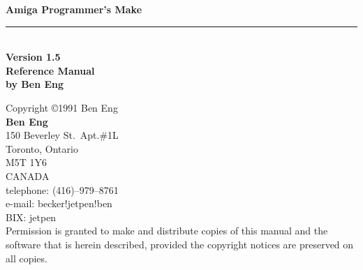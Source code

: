 


\begin{titlepage}
	\vspace*{1.0in}
	\begin{flushright}
		{\huge\bf Amiga Programmer's Make} \\[.25cm]
		{\rule[.1in]{4.5in}{.02in}}\\[.25cm]
		{\large\bf Version 1.5} \\[2.0cm]
		{\large\bf Reference Manual} \\[4.0cm]
		{\bf by Ben Eng}\\
    \end{flushright}
	\newpage
	\thispagestyle{empty}
	\vspace*{\fill}
	\begin{flushleft}
		{Copyright \copyright 1991 Ben Eng}\\[2.0cm]
		{\bf Ben Eng}\\[.25cm]
		{150 Beverley St.\ Apt.\#{}1L}\\
		{Toronto, Ontario}\\
		{M5T 1Y6}\\
		{CANADA}\\[2.0cm]
		{telephone: (416)--979--8761}\\
		{e-mail:  becker!jetpen!ben}\\
		{BIX: jetpen}\\[2.0cm]
{Permission is granted to make and distribute copies of this
manual and the software that is herein described, provided the copyright
notices are preserved on all copies.}\\
    \end{flushleft}
\end{titlepage}

\setcounter{page}{1}
\tableofcontents
\renewcommand{\thepage}{\arabic{page}}

\begin{abstract}
Make is a programming utility used to automate the process of recompiling
multiple interdependent source files into an output file (the goal).  The
Make program uses rules of inference to make the goal.  The rules for
making the goal are explicitly stated in an input file called the Makefile,
and implicitly determined from builtin rules.  Normally, the Makefile for a
goal is written so that the only thing that needs to be done to recompile
newly modified source files is to run the Make program.
\end{abstract}

